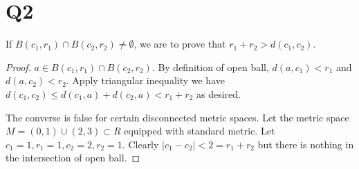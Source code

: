 \documentclass[12pt]{article}
\begin{document}
\section{Q2}
If $B(c_1, r_1) \cap B(c_2, r_2) \neq \emptyset$, we are to prove that $r_1 + r_2 > d(c_1, c_2)$.
\begin{proof}
$a \in B(c_1, r_1) \cap B(c_2, r_2)$. By definition of open ball, $d(a, c_1) < r_1$ and $d(a, c_2) < r_2$. Apply triangular inequality we have $d(c_1, c_2) \leq d(c_1, a) + d(c_2, a) < r_1 + r_2$ as desired.

The converse is false for certain disconnected metric spaces.
Let the metric space $M = (0,1) \cup (2,3) \subset R$ equipped with standard metric. Let $c_1 = 1, r_1 = 1, c_2=2, r_2 = 1$. Clearly $|c_1 - c_2| < 2 = r_1 + r_2$ but there is nothing in the intersection of open ball.
\end{proof}
\end{document}
